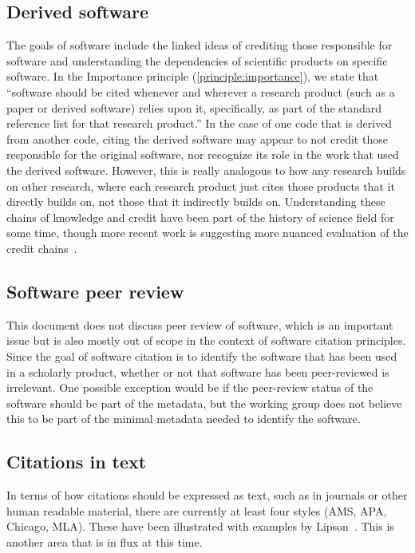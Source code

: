 \documentclass[11pt, oneside]{amsart}
\begin{document}
\subsection{Derived software}

The goals of software include the linked ideas of crediting those responsible for software and understanding the dependencies of scientific products on specific software.
In the Importance principle (\ref{principle:importance}), we state that
``software should be cited whenever and wherever a research product (such as a paper or derived software) relies upon it, specifically, as part of the standard reference list for that research product.''
In the case of one code that is derived from another code, citing the derived software may appear to not credit those responsible for the original software, nor recognize its role in the work that used the derived software.
However, this is really analogous to how any research builds on other research, where each research product just cites those products that it directly builds on, not those that it indirectly builds on.
Understanding these chains of knowledge and credit have been part of the history of science field for some time, though more recent work is suggesting more nuanced evaluation of the credit chains~\cite{casrai-credit, transitive_credit_json-ld}.

\subsection{Software peer review}

This document does not discuss peer review of software, which is an important issue but is
also mostly out of scope in the context of software citation principles.
Since the goal of software citation is to identify the software
that has been used in a scholarly product, whether or not that software has been peer-reviewed
is irrelevant.  One possible exception would be if the peer-review status of the software should
be part of the metadata, but the working group does not believe this to be part of the
minimal metadata needed to identify the software.

\subsection{Citations in text}

In terms of how citations should be expressed as text, such
as in journals or other human readable material, there are currently at least four styles (AMS, APA, Chicago, MLA). These have been illustrated with examples by Lipson~\cite{lipson2011cite}.
This is another area that is in flux at this time.
\end{document}
